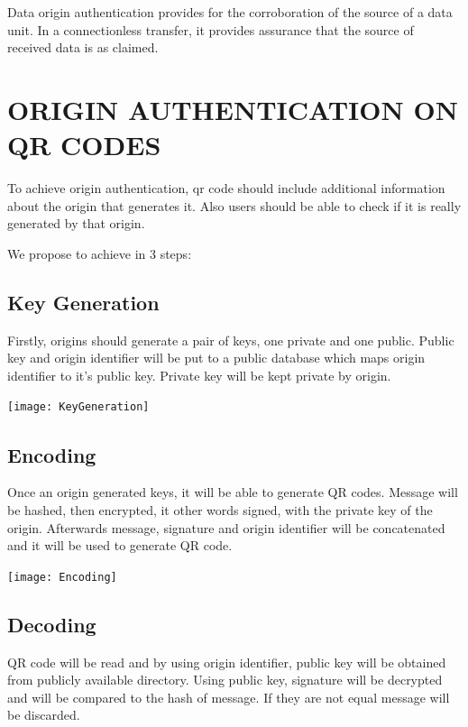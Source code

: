 \documentclass[12pt,journal,compsoc]{IEEEtran}
\begin{document}
Data origin authentication provides for the corroboration of the source
of a data unit. In a connectionless transfer, it provides assurance that
the source of received data is as claimed.


\section{ORIGIN AUTHENTICATION ON QR CODES}

To achieve origin authentication, qr code should include additional information about the origin that generates it. Also users should be able to check if it is really generated by that origin.

We propose to achieve in 3 steps: 


\subsection{Key Generation}

Firstly, origins should generate a pair of keys, one private and one public. Public key and origin identifier will be put to a public database which maps origin identifier to it's public key. Private key will be kept private by origin.


\begin{center}
\texttt{[image: KeyGeneration]}
\end{center}

\subsection{Encoding}

Once an origin generated keys, it will be able to generate QR codes. Message will be hashed, then encrypted, it other words signed, with the private key of the origin. Afterwards message, signature and origin identifier will be concatenated and it will be used to generate QR code.

\begin{center}
\texttt{[image: Encoding]}
\end{center}


\subsection{Decoding}

QR code will be read and by using origin identifier, public key will be obtained from publicly available directory. Using public key, signature will be decrypted and will be compared to the hash of message. If they are not equal message will be discarded. 
\end{document}

